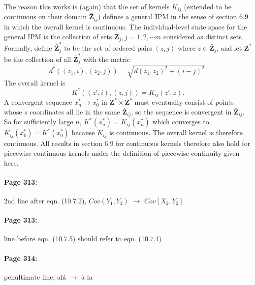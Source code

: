 \documentclass[12pt]{article}
\numberwithin{Box}{section}
\def\Z{\mathbf{Z}}
\newcommand{\be}{\begin{equation}}
\newcommand{\ee}{\end{equation}}
\begin{document}
The reason this works is (again) that the set of kernels $K_{ij}$ (extended to be continuous on their
domain $\bar{\Z}_{ij}$) defines a general IPM in the sense of section 6.9 in which the overall 
kernel is continuous. The individual-level state space for the general IPM is the collection of 
sets $\bar{\Z}_j, j=1,2,\cdots m$ considered as distinct sets. Formally, define $\bar{\Z}^*_j$ to be 
the set of ordered pairs $(z,j)$ where $z \in \bar{\Z}_j$, and let $\Z^*$ be the collection 
of all $\bar{\Z}^*_j$ with the metric
\be
d^*((z_1,i),(z_2,j)) = \sqrt{d(z_1,z_2)^2 + (i-j)^2}. 
\ee
The overall kernel is
\be
K^*((z',i),(z,j)) = K_{ij}(z',z). 
\ee
A convergent sequence $x^*_n \to x^*_0$ in $\Z^* \times \Z^*$ must eventually consist of points whose $z$ coordinates 
all lie in the same $\bar{\Z}_{ij}$, so the sequence is convergent in $\bar{\Z}_{ij}$. So for sufficiently large $n$, 
$K^*(x^*_n) = K_{ij}(x^*_n)$ which converges to $K_{ij}(x^*_0)=K^*(x^*_0)$ because $K_{ij}$ is continuous. The overall
kernel is therefore continuous. All results in section 6.9 for continuous kernels therefore also hold for
piecewise continuous kernels under the definition of piecewise continuity given here. 

\paragraph{Page 313:} 2nd line after eqn. (10.7.2), $Cov(Y_1,Y_2)$ $\to$ $Cov[X_2,Y_2]$

\paragraph{Page 313:} line before eqn. (10.7.5) should refer to eqn. (10.7.4)

\paragraph{Page 314:} penultimate line, al\'{a} $\to$ \`{a}  la 
\end{document}
